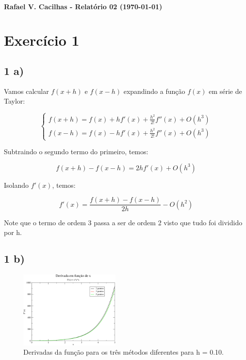 \documentclass[a4wide]{report}
\begin{document}
\noindent
{\bf Rafael V. Cacilhas  - Relatório 02 (\today)}

\vspace{0.5cm}

\section*{Exercício 1}


\subsection*{1 a) }
Vamos calcular $f(x+h)$ e $f(x-h)$ expandindo a função $f(x)$ em série de Taylor:

\begin{equation}
\begin{cases}
f(x+h) = f(x) + h f'(x) + \frac{h^{2}}{2!}  f''(x) + O(h^{3})
 \\
f(x-h) = f(x) - h f'(x) + \frac{h^{2}}{2!}  f''(x) + O(h^{3}) 
 
 
 \end{cases}
\end{equation}

Subtraindo o segundo termo do primeiro, temos:

\begin{equation}
f(x+h) - f(x-h) = 2h f'(x)  +   O(h^{3})
\end{equation}

Isolando $f'(x)$, temos:

\begin{equation}
f'(x) =\frac{ f(x+h) - f(x-h)}{2h} -   O(h^{2})
\end{equation}

Note que o termo de ordem 3 passa a ser de ordem 2 visto que tudo foi dividido por h.


\subsection*{1 b) }
\begin{figure}[!htb]
\centering
\includegraphics[width=0.447\textwidth]{derivadah1.pdf}
\caption{Derivadas da função para os três métodos diferentes para h = 0.10.}
\label{derivada}
\end{figure}
\end{document}
